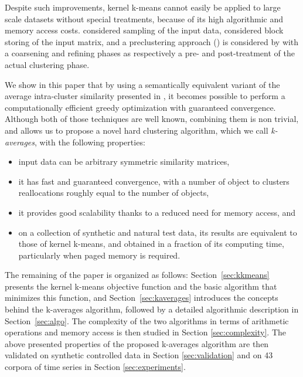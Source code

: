 \documentclass[10pt,journal,compsoc]{IEEEtran}
\begin{document}

Despite such improvements, kernel k-means cannot easily be applied to large scale datasets without special treatments, because of its high algorithmic and memory access costs. 
\cite{Chitta:2011:AKK:2020408.2020558} considered sampling of the input data, \cite{1047453} considered block storing of the input matrix, and a preclustering  approach (\cite{bradley98scaling, conf/icde/GantiRGPF99}) is considered by \cite{Kulis2008} with a coarsening and refining phases as respectively a pre- and post-treatment of the actual clustering phase.

We show in this paper that by using a semantically equivalent variant of the average intra-cluster similarity presented in \cite[Chapter 10.7]{Duda01}, it becomes possible to perform a computationally efficient greedy optimization \cite[Chapter 10.8]{Duda01} with guaranteed convergence. Although both of those techniques are well known, combining them is non trivial, and allows us to propose a novel hard clustering algorithm, which we call \emph{k-averages}, with the following properties: 
\begin{itemize}
\item input data can be arbitrary symmetric similarity matrices,
\item it has fast and guaranteed convergence, with a number of object to clusters reallocations roughly equal to the number of objects,
\item it provides good scalability thanks to a reduced need for memory access, and
\item on a collection of synthetic and natural test data, its results are equivalent to those of kernel k-means, and obtained in a fraction of its computing time, particularly when paged memory is required.
\end{itemize}

The remaining of the paper is organized as follows: Section~\ref{sec:kkmeans} presents the kernel k-means objective function and the basic algorithm that minimizes this function, and Section~\ref{sec:kaverages} introduces the concepts behind the k-averages algorithm, 
followed by a detailed algorithmic description in Section~\ref{sec:algo}. 
The complexity of the two algorithms in terms of arithmetic operations and memory access is then studied in Section \ref{sec:complexity}. The above presented properties of the proposed k-averages algorithm are then validated on synthetic controlled data in Section \ref{sec:validation} and on 43 corpora of time series in Section \ref{sec:experiments}.
\end{document}
